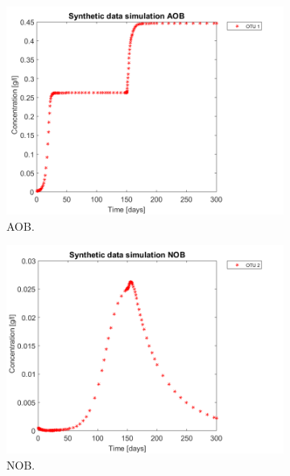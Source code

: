 \documentclass[3p,times]{article}
\begin{document}
\begin{figure}[h]
	\centering
	\begin{subfigure}{0.32 \linewidth}
	\includegraphics[width=\linewidth]{proof_of_concept/250309_POC_AOB_plot}
	\caption{AOB.}
	\label{PC_synthetic_AOB}
	\end{subfigure}
	\begin{subfigure}{0.32 \linewidth}
	\centering
	\includegraphics[width=\linewidth]{proof_of_concept/250309_POC_NOB_plot}
	\caption{NOB.}
	\label{PC_synthetic_NOB}
	\end{subfigure}
	\begin{subfigure}{0.32 \linewidth}
	\centering

\end{subfigure}
\end{figure}
\end{document}
